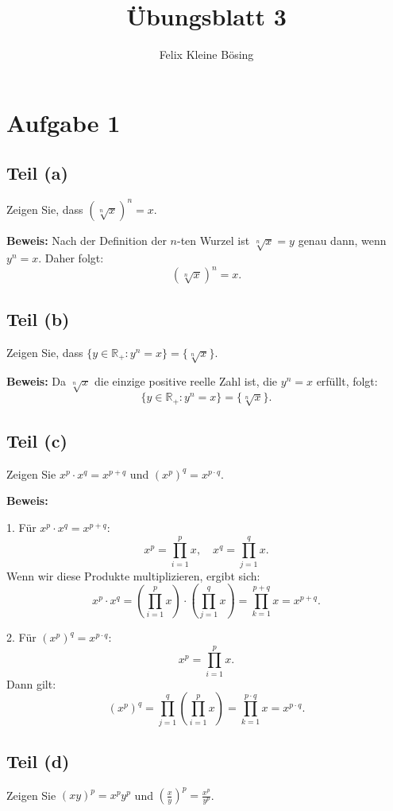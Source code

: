 \documentclass[11pt]{article}
\begin{document}
\title{Übungsblatt 3}
\author{Felix Kleine Bösing}
\maketitle

\section*{Aufgabe 1}

\subsection*{Teil (a)}
Zeigen Sie, dass \( \left( \sqrt[n]{x} \right)^n = x \).

\textbf{Beweis:} Nach der Definition der \( n \)-ten Wurzel ist \( \sqrt[n]{x} = y \) genau dann, wenn \( y^n = x \). Daher folgt:
\[
\left( \sqrt[n]{x} \right)^n = x.
\]

\subsection*{Teil (b)}
Zeigen Sie, dass \( \{ y \in \mathbb{R}_+ : y^n = x \} = \{ \sqrt[n]{x} \} \).

\textbf{Beweis:} Da \( \sqrt[n]{x} \) die einzige positive reelle Zahl ist, die \( y^n = x \) erfüllt, folgt:
\[
\{ y \in \mathbb{R}_+ : y^n = x \} = \{ \sqrt[n]{x} \}.
\]

\subsection*{Teil (c)}
Zeigen Sie \( x^p \cdot x^q = x^{p+q} \) und \( (x^p)^q = x^{p \cdot q} \).

\textbf{Beweis:}

1. Für \( x^p \cdot x^q = x^{p+q} \):
   \[
   x^p = \prod_{i=1}^{p} x, \quad x^q = \prod_{j=1}^{q} x.
   \]
   Wenn wir diese Produkte multiplizieren, ergibt sich:
   \[
   x^p \cdot x^q = \left( \prod_{i=1}^{p} x \right) \cdot \left( \prod_{j=1}^{q} x \right) = \prod_{k=1}^{p+q} x = x^{p+q}.
   \]

2. Für \( (x^p)^q = x^{p \cdot q} \):
   \[
   x^p = \prod_{i=1}^{p} x.
   \]
   Dann gilt:
   \[
   (x^p)^q = \prod_{j=1}^{q} \left( \prod_{i=1}^{p} x \right) = \prod_{k=1}^{p \cdot q} x = x^{p \cdot q}.
   \]

\subsection*{Teil (d)}
Zeigen Sie \( (xy)^p = x^p y^p \) und \( \left( \frac{x}{y} \right)^p = \frac{x^p}{y^p} \).
\end{document}
